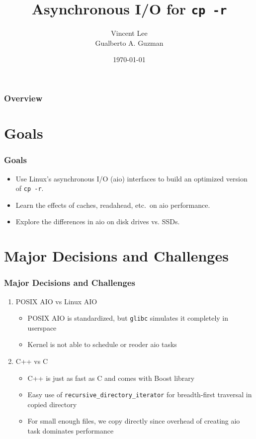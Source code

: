 \documentclass{beamer}
\title[AIO for \texttt{cp -r}]{Asynchronous I/O for \texttt{cp -r}}
\author[V. Lee, G. Guzman]{Vincent Lee \\
        Gualberto A. Guzman}
\institute[UT Austin]{
    University of Texas at Austin \\
    \medskip
    \textit{vincent\_lee@utexas.edu, gualbertoguzman@utexas.edu}
}
\date{\today}
\begin{document}
\begin{frame}
    \titlepage
\end{frame}

\begin{frame}
    \frametitle{Overview}
    \tableofcontents
\end{frame}

\section{Goals}
\begin{frame}
    \frametitle{Goals}
    \begin{itemize}
        \item{Use Linux's asynchronous I/O (aio) interfaces to build an
            optimized version of \texttt{cp -r}. }
        \item{Learn the effects of caches, readahead, etc.\ on aio performance. }
        \item{Explore the differences in aio on disk drives vs. SSDs. }
    \end{itemize}
\end{frame}

\section{Major Decisions and Challenges}
\begin{frame}
    \frametitle{Major Decisions and Challenges}
    \begin{enumerate}[1.]
        \item{POSIX AIO vs Linux AIO }
            \begin{itemize}
                \item{POSIX AIO is standardized, but \texttt{glibc} simulates it
                        completely in userspace~\cite{aio7} }
                \item{Kernel is not able to schedule or reoder aio tasks }
            \end{itemize}
        \item{C++ vs C }
            \begin{itemize}
                \item{C++ is just as fast as C and comes with Boost library }
                \item{Easy use of \texttt{recursive\_directory\_iterator} for
                        breadth-first traversal in copied directory }
                \item{For small enough files, we copy directly since overhead of
                        creating aio task dominates performance }
            \end{itemize}
    \end{enumerate}
\end{frame}
\end{document}
